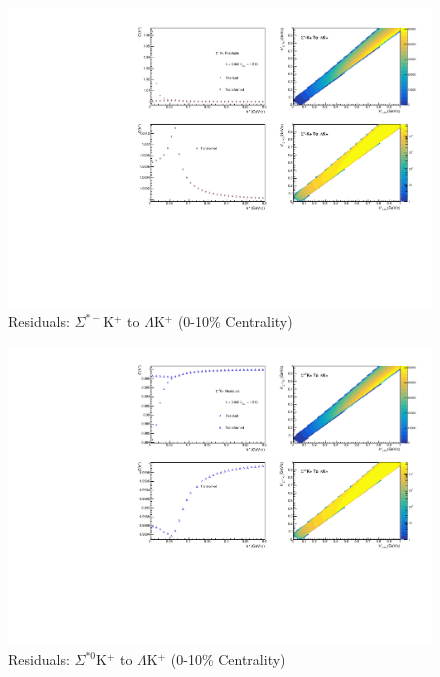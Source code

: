 \documentclass[../AnalysisNoteJBuxton.tex]{subfiles}
\begin{document}
\begin{figure}[h]
  \centering
  \includegraphics[width=\textwidth]{9_AdditionalFigures/Figures/Residuals/LamKchP/Residuals_LamKchP_0010_SigStMKchP_MomResCrctn_NonFlatBgdCrctn_10Res_PrimMaxDecay4fm_UsingXiDataAndCoulombOnly.pdf}
  \caption[Residuals: $\Sigma^{*-}$K$^{+}$ to $\Lambda$K$^{+}$ (0-10\% Centrality)]{Residuals: $\Sigma^{*-}$K$^{+}$ to $\Lambda$K$^{+}$ (0-10\% Centrality)}
  \label{fig:Res_LamKchP_0010_SigStMKchP}
\end{figure}

\begin{figure}[h]
  \centering
  \includegraphics[width=\textwidth]{9_AdditionalFigures/Figures/Residuals/LamKchP/Residuals_LamKchP_0010_SigSt0KchP_MomResCrctn_NonFlatBgdCrctn_10Res_PrimMaxDecay4fm_UsingXiDataAndCoulombOnly.pdf}
  \caption[Residuals: $\Sigma^{*0}$K$^{+}$ to $\Lambda$K$^{+}$ (0-10\% Centrality)]{Residuals: $\Sigma^{*0}$K$^{+}$ to $\Lambda$K$^{+}$ (0-10\% Centrality)}
  \label{fig:Res_LamKchP_0010_SigSt0KchP}
\end{figure}
\end{document}
